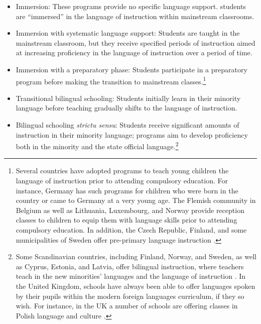 \documentclass[output=paper,colorlinks,citecolor=brown]{langscibook}
\begin{document}
\begin{itemize}

\item Immersion: These programs provide no specific language support. students are ``immersed'' in the language of instruction within mainstream classrooms.

\item Immersion with systematic language support: Students are taught in the mainstream classroom, but they receive specified periods of instruction aimed at increasing proficiency in the language of instruction over a period of time.
\item Immersion with a preparatory phase: Students participate in a preparatory program before making the transition to mainstream classes.\footnote{Several countries have adopted programs to teach young children the language of instruction prior to attending compulsory education.  For instance, Germany has such programs for children who were born in the country or came to Germany at a very young age. The Flemish community in Belgium as well as Lithuania, Luxembourg, and Norway provide reception classes to children to equip them with language skills prior to attending compulsory education.  In addition, the Czech Republic, Finland, and some municipalities of Sweden offer pre-primary language instruction \citep{papademetriou2009}.}
\item Transitional bilingual schooling: Students initially learn in their minority language before teaching gradually shifts to the language of instruction.

\item Bilingual schooling \textit{strictu sensu}: Students receive significant amounts of instruction in their minority language; programs aim to develop proficiency both in the minority and the state official language.\footnote{Some Scandinavian countries, including Finland, Norway, and Sweden, as well as Cyprus, Estonia, and Latvia, offer bilingual instruction, where teachers teach in the new minorities' languages and the language of instruction \citep{papademetriou2009}. In the United  Kingdom, schools  have  always  been  able  to  offer  languages  spoken  by  their  pupils  within  the  modern  foreign languages curriculum, if they so wish. For instance, in the UK a number of schools are offering classes in Polish language and culture \citep{eurydice2009}.}

\end{itemize}
\end{document}
